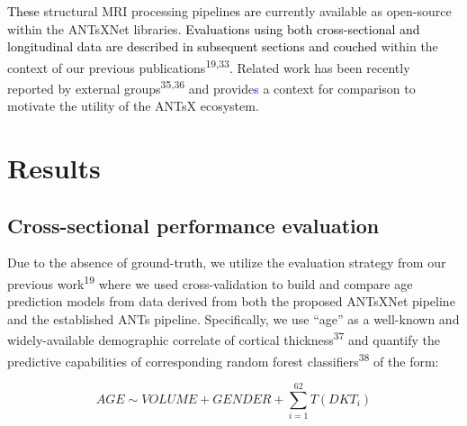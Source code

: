\documentclass[12pt,]{article}
\begin{document}
\textcolor{black}{These} structural MRI processing
pipeline\textcolor{black}{s
are} currently available as open-source within the ANTsXNet libraries.
\textcolor{black}{Evaluations using both cross-sectional and longitudinal data
are described in subsequent sections and couched} within the context of
our previous publications\textsuperscript{19,33}. Related work has been
recently reported by external groups\textsuperscript{35,36} and
provide\textcolor{blue}{s} a context for comparison to motivate the
utility of the ANTsX ecosystem.

\hypertarget{results}{%
\section*{Results}\label{results}}

\hypertarget{cross-sectional-performance-evaluation}{%
\subsection*{Cross-sectional performance
evaluation}\label{cross-sectional-performance-evaluation}}



Due to the absence of ground-truth, we utilize the evaluation strategy
from our previous work\textsuperscript{19} where we used
cross-validation to build and compare age prediction models from data
derived from both the proposed ANTsXNet pipeline and the established
ANTs pipeline. Specifically, we use ``age'' as a well-known and
widely-available demographic correlate of cortical
thickness\textsuperscript{37} and quantify the predictive capabilities
of corresponding random forest classifiers\textsuperscript{38} of the
form:

\begin{equation}
AGE \sim VOLUME + GENDER + \sum_{i=1}^{62} T(DKT_i)
\end{equation}
\end{document}
